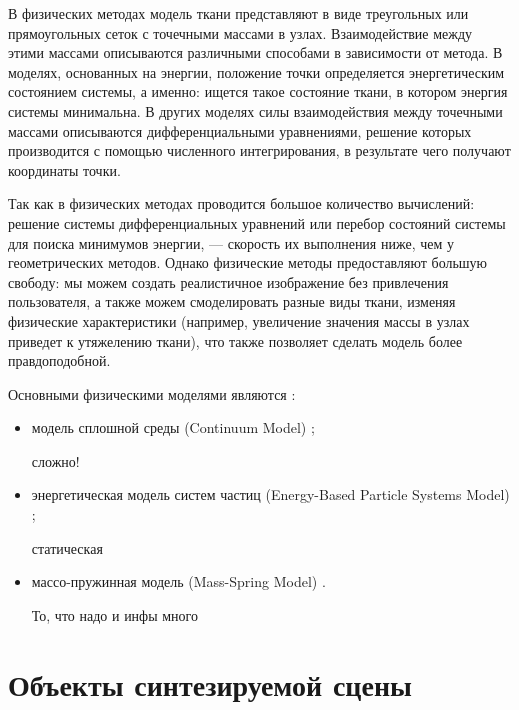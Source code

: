 В физических методах модель ткани представляют в виде  треугольных или
прямоугольных сеток с точечными массами в узлах. Взаимодействие между этими
массами  описываются различными способами в зависимости от метода. В моделях,
основанных на энергии, положение точки определяется энергетическим состоянием
системы, а именно: ищется такое состояние ткани, в котором энергия системы
минимальна. В других моделях силы взаимодействия между точечными массами
описываются дифференциальными уравнениями, решение которых производится с
помощью численного интегрирования, в результате чего получают координаты точки.
\cite{bib07}

Так как в физических методах проводится большое количество вычислений: решение
системы дифференциальных уравнений или перебор состояний системы для поиска
минимумов энергии, --- скорость их выполнения ниже, чем у геометрических
методов. Однако физические методы предоставляют большую свободу: мы можем
создать реалистичное изображение без привлечения пользователя, а также можем
смоделировать разные виды ткани, изменяя физические характеристики (например,
увеличение значения массы в узлах приведет к утяжелению ткани), что также
позволяет сделать модель более правдоподобной. \cite{bib07}

Основными физическими моделями являются \cite{bib11}:
\begin{itemize}[left=\parindent]
    \item модель сплошной среды (Continuum Model) \cite{bib12};

        сложно!

    \item энергетическая модель систем частиц (Energy-Based Particle Systems Model) \cite{bib13};

        статическая

    \item массо-пружинная модель (Mass-Spring Model) \cite{bib14}.

        То, что надо и инфы много

\end{itemize}

\section{Объекты синтезируемой сцены}

